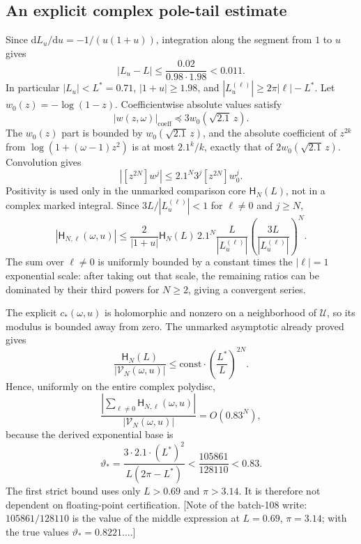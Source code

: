 \documentclass[11pt]{article}
\numberwithin{equation}{section}
\theoremstyle{definition}
\theoremstyle{remark}
\begin{document}
\subsection{An explicit complex pole-tail estimate}\label{mxc:pm:sec:markedtail}
Since $\mathrm dL_u/\mathrm du=-1/(u(1+u))$, integration along the segment
from $1$ to $u$ gives
\[
 |L_u-L|\le\frac{0.02}{0.98\cdot1.98}<0.011.
\]
In particular $|L_u|<L^*=0.71$, $|1+u|\ge1.98$, and
$|L_u^{(\ell)}|\ge2\pi|\ell|-L^*$. Let $w_0(z)=-\log(1-z)$. Coefficientwise
absolute values satisfy
\begin{equation}\label{mxc:pm:eq:majorant}
 |w(z,\omega)|_{\mathrm{coeff}}\preceq3w_0(\sqrt{2.1}\,z).
\end{equation}
The $w_0(z)$ part is bounded by $w_0(\sqrt{2.1}\,z)$, and the absolute
coefficient of $z^{2k}$ from $\log(1+(\omega-1)z^2)$ is at most $2.1^k/k$,
exactly that of $2w_0(\sqrt{2.1}\,z)$. Convolution gives
\[
 |[z^{2N}]w^j|\le 2.1^N3^j[z^{2N}]w_0^j.
\]
Positivity is used only in the unmarked comparison core $\mathsf H_N(L)$, not in
a complex marked integral. Since $3L/|L_u^{(\ell)}|<1$ for $\ell\ne0$ and
$j\ge N$,
\begin{equation}\label{mxc:pm:eq:markedtailabs}
 |\mathsf H_{N,\ell}(\omega,u)|\le
 \frac2{|1+u|}\mathsf H_N(L)\,2.1^N\frac{L}{|L_u^{(\ell)}|}
             \left(\frac{3L}{|L_u^{(\ell)}|}\right)^N.
\end{equation}
The sum over $\ell\ne0$ is uniformly bounded by a constant times the
$|\ell|=1$ exponential scale: after taking out that scale, the remaining
ratios can be dominated by their third powers for $N\ge2$, giving a
convergent series.

The explicit $c_*(\omega,u)$ is holomorphic and nonzero on a neighborhood of
$\mathcal U$, so its modulus is bounded away from zero. The unmarked
asymptotic already proved gives
\[
 \frac{\mathsf H_N(L)}{|\mathcal V_N(\omega,u)|}
    \le\mathrm{const}\cdot\left(\frac{L^*}{L}\right)^{2N}.
\]
Hence, uniformly on the entire complex polydisc,
\begin{equation}\label{mxc:pm:eq:markedtailrelative}
 \frac{\left|\sum_{\ell\ne0}\mathsf H_{N,\ell}(\omega,u)\right|}{|\mathcal V_N(\omega,u)|}
 =O(0.83^N),
\end{equation}
because the derived exponential base is
\[
 \vartheta_* =\frac{3\cdot2.1\cdot(L^*)^2}{L(2\pi-L^*)}
 <\frac{105861}{128110}<0.83.
\]
The first strict bound uses only $L>0.69$ and $\pi>3.14$. It is therefore not
dependent on floating-point certification. [Note of the batch-108 write:
$105861/128110$ is the value of the middle expression at $L=0.69$,
$\pi=3.14$; with the true values $\vartheta_*=0.8221\ldots$.]
\end{document}
